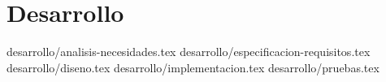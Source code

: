 \chapter {Desarrollo}
 {desarrollo/analisis-necesidades.tex}
 {desarrollo/especificacion-requisitos.tex}
 {desarrollo/diseno.tex}
 {desarrollo/implementacion.tex}
 {desarrollo/pruebas.tex}
